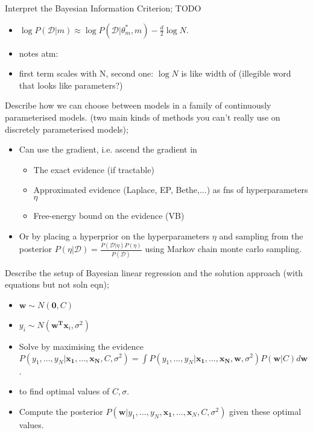 \documentclass{article}
\begin{document}
Interpret the Bayesian Information Criterion; TODO \begin{itemize}
    \item $\log P(\mathcal{D}|m)\approx \log P(\mathcal{D}|\theta^*_m, m)-\frac{d}{2}\log N$.
    \item notes atm:
    \item first term scales with N, second one: $\log N$ is like width of (illegible word that looks like parameters?)
\end{itemize}

Describe how we can choose between models in a family of continuously parameterised models. (two main kinds of methods you can't really use on discretely parameterised models); \begin{itemize}
    \item Can use the gradient, i.e. ascend the gradient in \begin{itemize}
        \item The exact evidence (if tractable)
        \item Approximated evidence (Laplace, EP, Bethe,...) as fns of hyperparameters $\eta$
        \item Free-energy bound on the evidence (VB)
    \end{itemize}
    \item Or by placing a hyperprior on the hyperparameters $\eta$ and sampling from the posterior $P(\eta|\mathcal{D})=\frac{P(\mathcal{D}|\eta)P(\eta)}{P(\mathcal{D})}$ using Markov chain monte carlo sampling.
\end{itemize}


Describe the setup of Bayesian linear regression and the solution approach (with equations but not soln eqn); \begin{itemize}
    \item $\mathbf{w}\sim N(\mathbf{0}, C)$
    \item $y_i\sim N(\mathbf{w^Tx}_i, \sigma^2)$
    \item Solve by maximising the evidence $P(y_1,...,y_N|\mathbf{x_1,...,x_N}, C, \sigma^2)=\int P(y_1,...,y_N|\mathbf{x_1,...,x_N,w}, \sigma^2)P(\mathbf{w}|C)d\mathbf{w}$.
    \item to find optimal values of $C, \sigma$.
    \item Compute the posterior $P(\mathbf{w}|y_1,...,y_N,\mathbf{x_1},...,\mathbf{x}_N, C, \sigma^2)$ given these optimal values.
\end{itemize}
\end{document}
